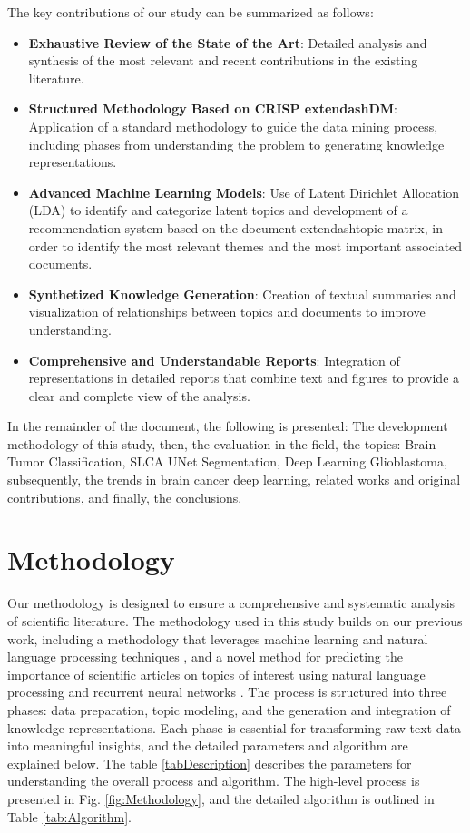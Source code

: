 \documentclass[runningheads]{llncs}
\begin{document}
The key contributions of our study can be summarized as follows: 

\begin{itemize}
    \item \textbf{Exhaustive Review of the State of the Art}: Detailed analysis and synthesis of the most relevant and recent contributions in the existing literature.
    \item \textbf{Structured Methodology Based on CRISP	extendash{}DM}: Application of a standard methodology to guide the data mining process, including phases from understanding the problem to generating knowledge representations.
    \item \textbf{Advanced Machine Learning Models}: Use of Latent Dirichlet Allocation (LDA) to identify and categorize latent topics and development of a recommendation system based on the document	extendash{}topic matrix, in order to identify the most relevant themes and the most important associated documents.
    \item \textbf{Synthetized Knowledge Generation}: Creation of textual summaries and visualization of relationships between topics and documents to improve understanding.
    \item \textbf{Comprehensive and Understandable Reports}: Integration of representations in detailed reports that combine text and figures to provide a clear and complete view of the analysis.
\end{itemize}

In the remainder of the document, the following is presented: The development methodology of this study, then, the evaluation in the field, the topics: Brain Tumor Classification, SLCA UNet Segmentation, Deep Learning Glioblastoma,  subsequently, the trends in brain cancer deep learning, related works and original contributions, and finally, the conclusions.
\section{Methodology}

Our methodology is designed to ensure a comprehensive and systematic analysis of scientific literature. The methodology used in this study builds on our previous work, including a methodology that leverages machine learning and natural language processing techniques \cite{Hurtado2023}, and a novel method for predicting the importance of scientific articles on topics of interest using natural language processing and recurrent neural networks \cite{Lopez2024}. The process is structured into three phases: data preparation, topic modeling, and the generation and integration of knowledge representations. Each phase is essential for transforming raw text data into meaningful insights, and the detailed parameters and algorithm are explained below. The table \ref{tabDescription} describes the parameters for understanding the overall process and algorithm. The high-level process is presented in Fig. \ref{fig:Methodology}, and the detailed algorithm is outlined in Table \ref{tab:Algorithm}.\\ 
\end{document}
